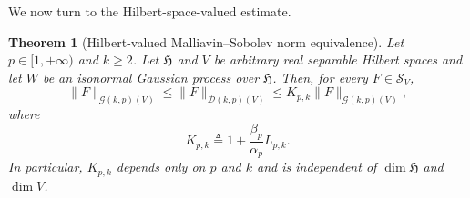 \documentclass[12pt]{article}
\theoremstyle{plain}
\newtheorem{theorem}{Theorem}[section]
\theoremstyle{definition}
\theoremstyle{remark}
\numberwithin{equation}{section}
\begin{document}
We now turn to the Hilbert-space-valued estimate.

\begin{theorem}[Hilbert-valued Malliavin--Sobolev norm equivalence]
	\label{thm:vector-malliavin-equivalence-all-p-k}
	Let $p\in[1,+\infty)$ and $k\geqslant2$.  Let $\mathfrak{H}$ and $V$ be arbitrary real separable Hilbert spaces and let $W$ be an isonormal Gaussian process over $\mathfrak{H}$.  Then, for every $F\in\mathcal{S}_{V}$,
	$$
	\|F\|_{\mathcal{G}(k,p)(V)}
	\leqslant
	\|F\|_{\mathcal{D}(k,p)(V)}
	\leqslant
	K_{p,k}\|F\|_{\mathcal{G}(k,p)(V)},
	$$
	where
	$$
	K_{p,k}
	\triangleq
	1+\frac{\beta_{p}}{\alpha_{p}}L_{p,k}.
	$$
	In particular, $K_{p,k}$ depends only on $p$ and $k$ and is independent of $\dim\mathfrak{H}$ and $\dim V$.
\end{theorem}
\end{document}
